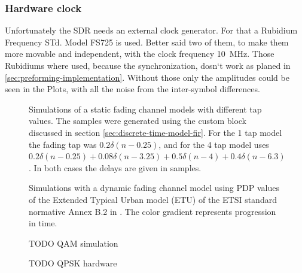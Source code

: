 \subsubsection{Hardware clock}
Unfortunately the SDR needs an external clock generator. For that a Rubidium Frequency STd. Model FS725 is used. Better said two of them, to make them more movable and independent, with the clock frequency \SI{10}{\mega\hertz}. Those Rubidiums where used, because the synchronization, dosn`t work as planed in \ref{sec:preforming-implementation}. 
Without those only the amplitudes could be seen in the Plots, with all the noise from the inter-symbol differences. 



\begin{figure}
	\centering
	\label{fig:qpsk-simulations-static}
	
	\caption{
		Simulations of a static fading channel models with different tap values. The samples were generated using the custom block discussed in section \ref{sec:discrete-time-model-fir}. For the 1 tap model the fading tap was \(0.2\delta(n - 0.25)\), and for the 4 tap model uses \(0.2 \delta(n - 0.25) + 0.08 \delta(n - 3.25) + 0.5 \delta(n - 4) + 0.4 \delta(n - 6.3)\). In both cases the delays are given in samples.
	}
\end{figure}
\newpage
\begin{figure}
	\centering
	
	\caption{
		Simulations with a dynamic fading channel model using PDP values of the Extended Typical Urban model (ETU) of the ETSI standard normative Annex B.2 in \cite{ETSI}. The color gradient represents progression in time.
		\label{fig:qpsk-simulations-dynamic}
	}
\end{figure}
\newpage
\begin{figure}
	\centering
	
	\caption{
		TODO QAM simulation
	}
\end{figure}
\begin{figure}
	\centering
	
	\caption{
		TODO QPSK hardware
	}
\end{figure}
\newpage
\restoregeometry
